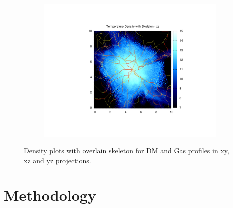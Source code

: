 \documentclass[journal]{IEEEtran}
\begin{document}
\begin{figure}[t!]
\begin{subfigure}[t]{0.3\textwidth}
		\includegraphics[width=\linewidth]{TempDenSkelxz}
	\end{subfigure}
\label{fig:densities}
\caption{Density plots with overlain skeleton for DM and Gas profiles in xy, xz and yz projections.}
\end{figure}

\section{Methodology}
\end{document}

